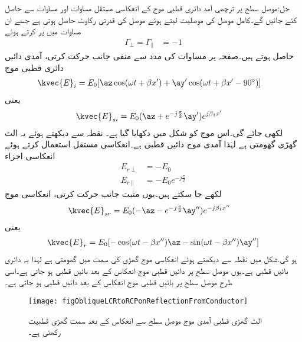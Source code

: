 حل:موصل سطح پر ترچھی آمد دائری قطبی موج کے  انعکاسی مستقل مساوات  اور مساوات  سے  حاصل کئے جائیں گے۔کامل موصل کی موصلیت  لیتے ہوئے  موصل کی قدرتی رکاوٹ  حاصل ہوتی ہے جسے ان مساوات میں پر کرتے ہوئے
\begin{align*}
\Gamma_{\perp}=\Gamma_{\parallel}&=-1
\end{align*}
حاصل ہوتے ہیں۔صفحہ  پر مساوات  کی مدد سے منفی  جانب حرکت کرتی، آمدی دائیں دائری قطبی موج
\begin{align*}
\kvec{E}_i&=E_0[\az\cos(\omega t +\beta x')+\ay' \cos(\omega t +\beta x' -90^{\circ})]
\end{align*}
یعنی
\begin{align*}
\kvec{E}_{si}&=E_0(\az+e^{-j\frac{\pi}{2}} \ay')e^{j\beta_1 x'}
\end{align*}
لکھی جائے گی۔اس موج کو شکل  میں دکھایا گیا ہے۔ نقطہ  سے دیکھتے ہوئے یہ الٹ گھڑی گھومتی ہے لہٰذا آمدی موج دائیں قطبی ہے۔انعکاسی مستقل استعمال کرتے ہوئے انعکاسی اجزاء 
\begin{align*}
E_{r\perp}&=-E_0\\
E_{r\parallel}&=- E_0 e^{-j\frac{\pi}{2}}
\end{align*}
لکھے جا سکتے ہیں۔یوں مثبت  جانب حرکت کرتی، انعکاسی موج
\begin{align*}
\kvec{E}_{sr}&=E_0(- \az- e^{-j\frac{\pi}{2}}\ay'')e^{-j\beta_1 x''}
\end{align*}
یعنی
\begin{align*}
\kvec{E}_r=E_0[-\cos (\omega t -\beta x'') \az -\sin(\omega t -\beta x'')\ay'']
\end{align*}
ہو گی.شکل  میں نقطہ  سے دیکھتے ہوئے انعکاسی موج گھڑی کی سمت میں گھومتی ہے لہٰذا یہ دائری بائیں قطبی ہے۔یوں موصل سطح پر دائیں قطبی موج انعکاس کے بعد بائیں قطبی ہو جاتی ہے۔اسی طرح موصل سطح پر بائیں قطبی موج انعکاس کے بعد دائیں قطبی ہو جاتی ہے۔
\begin{figure}
\centering
\texttt{[image: figObliqueLCRtoRCPonReflectionFromConductor]}
\caption{الٹ گھڑی قطبی آمدی موج موصل سطح سے انعکاس کے بعد سمت گھڑی قطبیت رکھتی ہے۔}
\label{شکل_قطبیت_الٹ_گھڑی_سے_سمت_گھڑی_قطبیت}
\end{figure}

